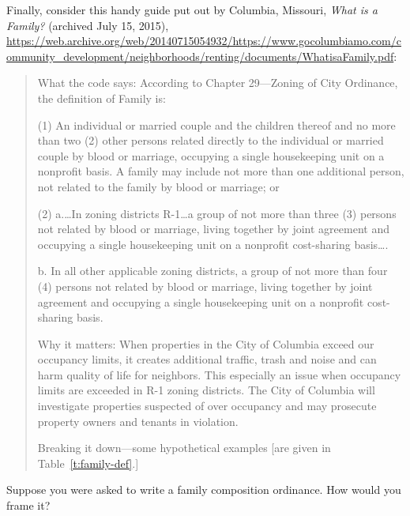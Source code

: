 \item
Finally, consider this handy guide put out by Columbia, Missouri, \emph{What is
a Family?} (archived July 15, 2015),
\url{https://web.archive.org/web/20140715054932/https://www.gocolumbiamo.com/community_development/neighborhoods/renting/documents/WhatisaFamily.pdf}:
\begin{quotation}
What the code says: According to Chapter 29---Zoning of City Ordinance, the
definition of Family is:
\begin{statute}
\item (1) An individual or married couple and the children thereof and no more
than two (2) other persons related directly to the individual or married couple
by blood or marriage, occupying a single housekeeping unit on a nonprofit basis.
A family may include not more than one additional person, not related to the
family by blood or marriage; or

\item (2) a.\ldots In zoning districts R-1\ldots a group of not more than three
(3) persons not related by blood or marriage, living together by joint agreement
and occupying a single housekeeping unit on a nonprofit cost-sharing
basis\ldots.
\begin{statute}
\item b. In all other applicable zoning districts, a group of not more than four
(4) persons not related by blood or marriage, living together by joint agreement
and occupying a single housekeeping unit on a nonprofit cost-sharing basis.
\end{statute}
\end{statute}
Why it matters: When properties in the City of Columbia exceed our occupancy
limits, it creates additional traffic, trash and noise and can harm quality of
life for neighbors. This especially an issue when occupancy limits are exceeded
in R-1 zoning districts. The City of Columbia will investigate properties
suspected of over occupancy and may prosecute property owners and tenants in
violation.

Breaking it down---some hypothetical examples [are given in
Table~\ref{t:family-def}.]
\end{quotation}


Suppose you were asked to write a family composition ordinance. How would you
frame it?

